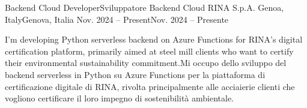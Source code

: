 


\begin{cventries}


\cventry
{\ifenglish Backend Cloud Developer\else Sviluppatore Backend Cloud\fi} %
{RINA S.p.A.} %
{\ifenglish Genoa, Italy\else Genova, Italia\fi} %
{\ifenglish Nov. 2024 -- Present\else Nov. 2024 -- Presente\fi} %
{ %
\begin{cvitems}
  \item {\ifenglish I'm developing Python serverless backend on Azure Functions for RINA's digital certification platform, primarily aimed at steel mill clients who want to certify their environmental sustainability commitment.\else Mi occupo dello sviluppo del backend serverless in Python su Azure Functions per la piattaforma di certificazione digitale di RINA, rivolta principalmente alle acciaierie clienti che vogliono certificare il loro impegno di sostenibilità ambientale.\fi}
\end{cvitems}
}



\end{cventries}

